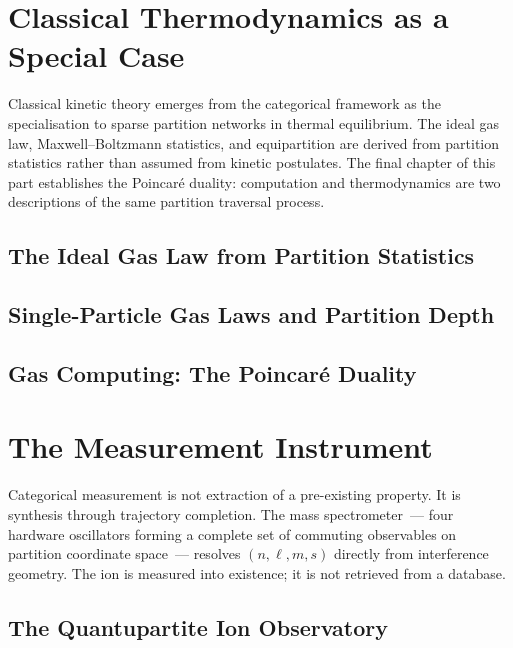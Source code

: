 \documentclass[12pt,a4paper,twoside,openright]{book}
\theoremstyle{plain}
\theoremstyle{definition}
\theoremstyle{remark}
\begin{document}
\part{Classical Thermodynamics as a Special Case}
\label{part:classical}

\noindent
Classical kinetic theory emerges from the categorical framework as the
specialisation to sparse partition networks in thermal equilibrium.
The ideal gas law, Maxwell--Boltzmann statistics, and equipartition
are derived from partition statistics rather than assumed from kinetic
postulates.
The final chapter of this part establishes the Poincar\'e duality:
computation and thermodynamics are two descriptions of the same
partition traversal process.

\chapter{The Ideal Gas Law from Partition Statistics}
\label{ch:idealgas}


\chapter{Single-Particle Gas Laws and Partition Depth}
\label{ch:singleparticle}


\chapter{Gas Computing: The Poincar\'e Duality}
\label{ch:gascomputing}


\part{The Measurement Instrument}
\label{part:instrument}

\noindent
Categorical measurement is not extraction of a pre-existing property.
It is synthesis through trajectory completion.
The mass spectrometer~--- four hardware oscillators forming a complete
set of commuting observables on partition coordinate space~--- resolves
$(n,\ell,m,s)$ directly from interference geometry.
The ion is measured into existence; it is not retrieved from a database.

\chapter{The Quantupartite Ion Observatory}
\label{ch:observatory}

\end{document}
